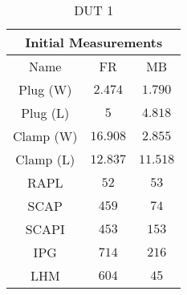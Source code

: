 \begin{table}[H]
    \centering
    \begin{tabular}{|| c | c | c ||}
    \hline
    \multicolumn{3}{||c||}{Initial Measurements} \\ [0.5ex] \hline\hline
    Name & FR & MB \\\hline
    Plug (W) & $2.474$ & $1.790$ \\
    Plug (L) & $5$ & $4.818$ \\
    Clamp (W) & $16.908$ & $2.855$ \\
    Clamp (L) & $12.837$ & $11.518$ \\
    RAPL & $52$ & $53$ \\
    SCAP & $459$ & $74$ \\
    SCAPI & $453$ & $153$ \\
    IPG & $714$ & $216$ \\
    LHM & $604$ & $45$ \\\hline
    \end{tabular}
    \caption{DUT 1}
    \label{tab:initial-measurements-exp-2-dut-1}
\end{table}